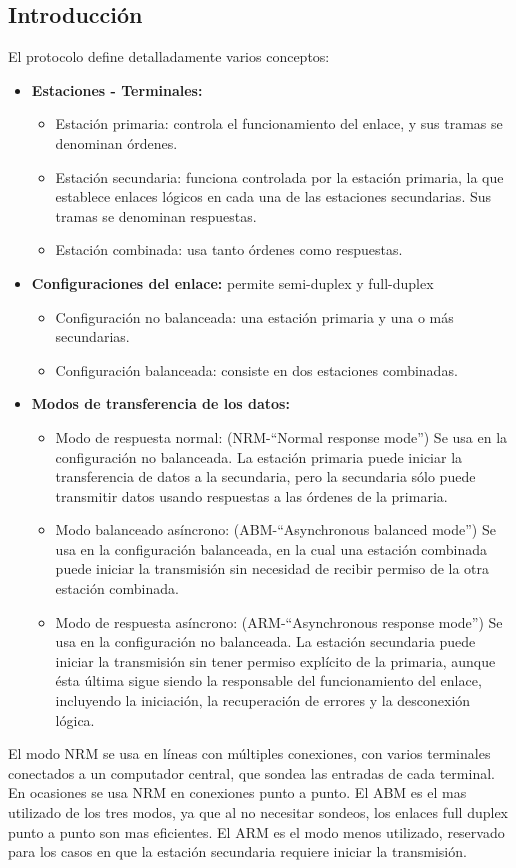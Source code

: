 \documentclass[withindex,glossary]{cam-thesis}
\begin{document}
\subsection{Introducción}
El protocolo define detalladamente varios conceptos:
\begin{itemize}
\item \textbf{Estaciones - Terminales:}
	\begin{itemize}[label={--}]
	\item Estación primaria: controla el funcionamiento del enlace, y sus tramas se denominan órdenes.
    \item Estación secundaria: funciona controlada por la estación primaria, la que establece enlaces lógicos en cada una de las estaciones secundarias. Sus tramas se denominan respuestas.
    \item Estación combinada: usa tanto órdenes como respuestas.
	\end{itemize}
\item \textbf{Configuraciones del enlace:} permite semi-duplex y full-duplex
	\begin{itemize}[label={--}]
	\item Configuración no balanceada: una estación primaria y una o más secundarias.
    \item Configuración balanceada: consiste en dos estaciones combinadas.
	\end{itemize}
\item \textbf{Modos de transferencia de los datos:}
	\begin{itemize}[label={--}]
	\item Modo de respuesta normal: (NRM-“Normal response mode”) Se usa en la configuración no balanceada. La estación primaria puede iniciar la transferencia de datos a la secundaria, pero la secundaria sólo puede transmitir datos usando respuestas a las órdenes de la primaria.
    \item Modo balanceado asíncrono: (ABM-“Asynchronous balanced mode”) Se usa en la configuración balanceada, en la cual una estación combinada puede iniciar la transmisión sin necesidad de recibir permiso de la otra estación combinada.
    \item Modo de respuesta asíncrono: (ARM-“Asynchronous response mode”) Se usa en la configuración no balanceada. La estación secundaria puede iniciar la transmisión sin tener permiso explícito de la primaria, aunque ésta última sigue siendo la responsable del funcionamiento del enlace, incluyendo la iniciación, la recuperación de errores y la desconexión lógica.
	\end{itemize}
\end{itemize}
El modo NRM se usa en líneas con múltiples conexiones, con varios terminales conectados a un computador central, que sondea las entradas de cada terminal. En ocasiones se usa NRM en conexiones punto a punto. El ABM es el mas utilizado de los tres modos, ya que al no necesitar sondeos, los enlaces full duplex punto a punto son mas eficientes.
El ARM es el modo menos utilizado, reservado para los casos en que la estación secundaria requiere iniciar la transmisión.
\end{document}
